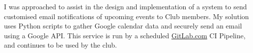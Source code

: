 \descript{ }
I was approached to assist in the design and implementation of a system to send customised email notifications of upcoming events to Club members.
My solution uses Python scripts to gather Google calendar data and securely send an email using a Google API.
This service is run by a scheduled \href{https://gitlab.com/}{GitLab.com} CI Pipeline, and continues to be used by the club.
\sectionsep{}
